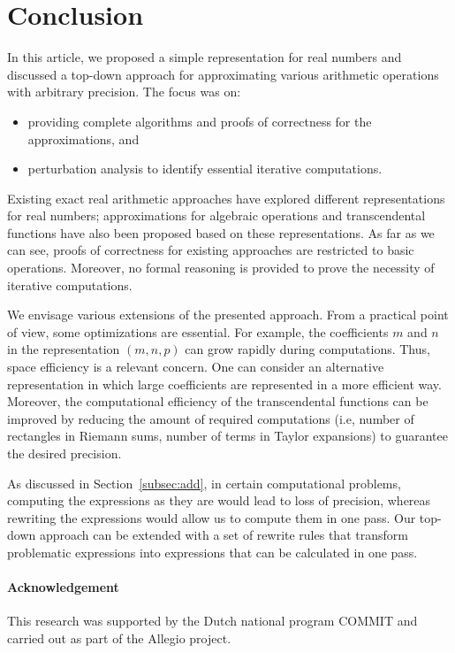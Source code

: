 \documentclass{article}
\numberwithin{mytheorem}{section}
\begin{document}
\section{Conclusion}
\label{sec:conclusion}
In this article, we proposed a simple representation for real numbers and discussed a top-down approach for approximating various arithmetic operations with arbitrary precision. The focus was on:
\begin{itemize}
\item
providing complete algorithms and proofs of correctness for the approximations, and
\item
perturbation analysis to identify essential iterative computations.
\end{itemize}

Existing exact real arithmetic approaches have explored different representations for real numbers; approximations for algebraic operations and transcendental functions have also been proposed based on these representations. As far as we can see, proofs of correctness for existing approaches are restricted to basic operations. Moreover, no formal reasoning is provided to prove the necessity of iterative computations.

We envisage various extensions of the presented approach. From a practical point of view, some optimizations are essential. For example, the coefficients $m$ and $n$ in the representation $(m,n,p)$ can grow rapidly during computations. Thus, space efficiency is a relevant concern. One can consider an alternative representation in which large coefficients are represented in a more efficient way. Moreover, the computational efficiency of the transcendental functions can be improved by reducing the amount of required computations (i.e, number of rectangles in Riemann sums, number of terms in Taylor expansions) to guarantee the desired precision. 

As discussed in Section~\ref{subsec:add}, in certain computational problems, computing the expressions as they are would lead to loss of precision, whereas rewriting the expressions would allow us to compute them in one pass. Our top-down approach can be extended with a set of rewrite rules that transform problematic expressions into expressions that can be calculated in one pass. 

\paragraph{Acknowledgement}
This research was supported by the Dutch national program
COMMIT and carried out as part of the Allegio project.
\end{document}
